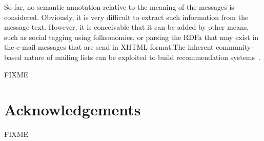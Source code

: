 \documentclass{../templates/www2008-submission}
\begin{document}
So far, no semantic annotation relative to the meaning of
the messages is considered. Obviously, it is very difficult
to extract such information from the message text.
However, it is conceivable that it can be added by other 
means, such as social tagging using folksonomies, or parsing the 
RDFa that may exist in the e-mail messages that are send in XHTML 
format.The inherent community-based nature of mailing lists can
be exploited to build recommendation systems~\cite{Celma2006}.

FIXME

\section*{Acknowledgements}

FIXME





\balancecolumns
\end{document}
